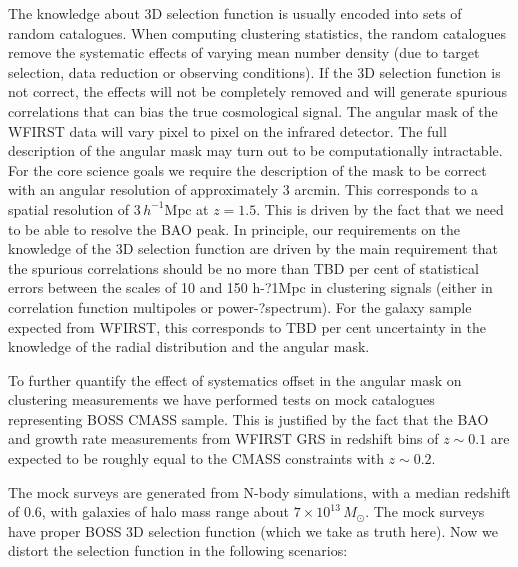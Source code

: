  The knowledge about 3D selection function is usually encoded into sets of random
 catalogues. When computing clustering statistics, the random catalogues remove
 the systematic effects of varying mean number density (due to target selection,
 data reduction or observing conditions). If the 3D selection function is not
 correct, the effects will not be completely removed and will generate spurious
 correlations that can bias the true cosmological signal. The angular mask of the
 WFIRST data will vary pixel to pixel on the infrared detector. The full
 description of the angular mask may turn out to be computationally intractable.
 For the core science goals we require the description of the mask to be correct
 with an angular resolution of approximately 3 arcmin. This corresponds to a
 spatial resolution of $3 \,h^{-1} \mathrm{Mpc}$ at $z=1.5$. This is driven by the fact that we
 need to be  able to resolve the BAO peak. In principle, our requirements on the
 knowledge of the 3D selection function are driven by the main requirement that
 the spurious correlations should be no more than TBD per cent of statistical
 errors between the scales of 10 and 150 h-­?1Mpc in clustering signals (either
 in correlation function multipoles or power-­?spectrum). For the galaxy sample
 expected from WFIRST, this corresponds to TBD per cent uncertainty in the
 knowledge of the radial distribution and the angular mask.

 To further quantify the effect of systematics offset in the angular mask on
 clustering measurements we have performed tests on mock catalogues representing
 BOSS CMASS sample. This is justified by the fact that the BAO and growth rate
 measurements from WFIRST GRS in redshift bins of $z\sim0.1$ are expected to be
 roughly equal to the CMASS constraints with $z\sim0.2$.

 The mock surveys are generated from N-body simulations, with a median redshift
 of 0.6, with galaxies of halo mass range about $7\times10^{13}\,M_\odot$. The mock
 surveys have proper BOSS 3D selection function (which we take as truth here).
 Now we distort the selection function in the following scenarios:


